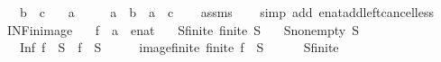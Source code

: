 \begin{isabellebody}
\ \ \ {\isachardoublequoteopen}b\ {\isacharless}{\kern0pt}\ c{\isachardoublequoteclose}\isanewline
\ \ \ {\isachardoublequoteopen}a\ {\isasymnoteq}\ {\isasyminfinity}{\isachardoublequoteclose}\isanewline
\ \ \ {\isachardoublequoteopen}a\ {\isacharplus}{\kern0pt}\ b\ {\isacharless}{\kern0pt}\ a\ {\isacharplus}{\kern0pt}\ c{\isachardoublequoteclose}%
\endisataginvisible
{\isafoldinvisible}%
%
\isadeliminvisible
\isanewline
%
\endisadeliminvisible
%
\isadelimproof
\ \ %
\endisadelimproof
%
\isatagproof
{}\isamarkupfalse%
\ assms\isanewline
\ \ \isamarkupfalse%
\ {\isacharparenleft}{\kern0pt}simp\ add{\isacharcolon}{\kern0pt}\ enat{\isacharunderscore}{\kern0pt}add{\isacharunderscore}{\kern0pt}left{\isacharunderscore}{\kern0pt}cancel{\isacharunderscore}{\kern0pt}less{\isacharparenright}{\kern0pt}%
\endisatagproof
{\isafoldproof}%
%
\isadelimproof
\isanewline
%
\endisadelimproof
%
\isadeliminvisible
\isanewline
%
\endisadeliminvisible
%
\isataginvisible
{}\isamarkupfalse%
\ INF{\isacharunderscore}{\kern0pt}in{\isacharunderscore}{\kern0pt}image{\isacharcolon}{\kern0pt}\isanewline
\ \ \ f\ {\isacharcolon}{\kern0pt}{\isacharcolon}{\kern0pt}\ {\isachardoublequoteopen}{\isacharprime}{\kern0pt}a\ {\isasymRightarrow}\ enat{\isachardoublequoteclose}\isanewline
\ \ \ S{\isacharunderscore}{\kern0pt}finite{\isacharcolon}{\kern0pt}\ {\isachardoublequoteopen}finite\ S{\isachardoublequoteclose}\isanewline
\ \ \ S{\isacharunderscore}{\kern0pt}non{\isacharunderscore}{\kern0pt}empty{\isacharcolon}{\kern0pt}\ {\isachardoublequoteopen}S\ {\isasymnoteq}\ {\isacharbraceleft}{\kern0pt}{\isacharbraceright}{\kern0pt}{\isachardoublequoteclose}\isanewline
\ \ \ {\isachardoublequoteopen}Inf\ {\isacharparenleft}{\kern0pt}f\ {\isacharbackquote}{\kern0pt}\ S{\isacharparenright}{\kern0pt}\ {\isasymin}\ f\ {\isacharbackquote}{\kern0pt}\ S{\isachardoublequoteclose}%
\endisataginvisible
{\isafoldinvisible}%
%
\isadeliminvisible
\isanewline
%
\endisadeliminvisible
%
\isadelimproof
%
\endisadelimproof
%
\isatagproof
{}\isamarkupfalse%
\ {\isacharminus}{\kern0pt}\isanewline
\ \ \isamarkupfalse%
\ image{\isacharunderscore}{\kern0pt}finite{\isacharcolon}{\kern0pt}\ {\isachardoublequoteopen}finite\ {\isacharparenleft}{\kern0pt}f\ {\isacharbackquote}{\kern0pt}\ S{\isacharparenright}{\kern0pt}{\isachardoublequoteclose}\isanewline
\ \ \ \ \isamarkupfalse%
\ S{\isacharunderscore}{\kern0pt}finite\isanewline

\end{isabellebody}
